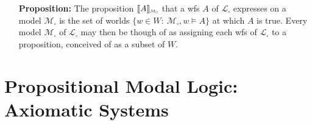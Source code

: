 \documentclass[a4paper, 11pt]{article} %
\newcommand{\set}[1]{\lbrace#1\rbrace} %
\newcommand{\interpret}[1]{\llbracket#1\rrbracket} %
\newcommand*{\Scale}[2][4]{\scalebox{#1}{$#2$}}%
\begin{document}
\begin{enumerate}[leftmargin=1.2in,labelsep=.15in]
\begin{small}
\begin{itemize}[leftmargin=.36in]
\end{itemize}
\end{small}
\item[\bf Proposition:] The proposition $\interpret{A}_{\Scale[0.5]{\mathcal{M}_\square}}$ that a wfs ${A}$ of $\mathcal{L}_\square$ expresses on a model $\mathcal{M}_\square$ is the set of worlds $\set{w\in W: ~\mathcal{M}_\square,w\vDash  A}$ at which ${A}$ is true. Every model $\mathcal{M}_\square$ of $\mathcal{L}_\square$ may then be though of as assigning each wfs of $\mathcal{L}_\square$ to a proposition, conceived of as a subset of $W$.
\end{enumerate}



\section*{\sc Propositional Modal Logic: Axiomatic Systems}
\end{document}
